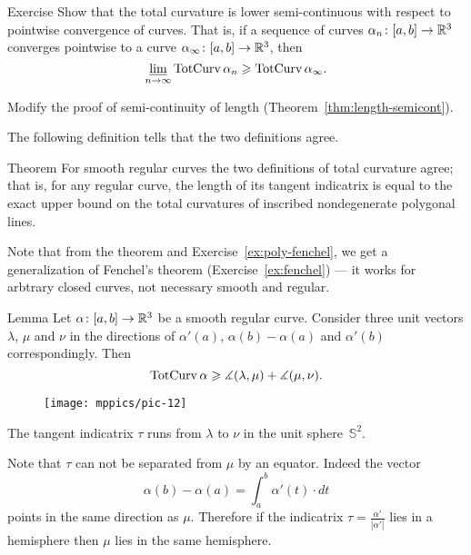 \begin{thm}{Exercise}
Show that the total curvature is lower semi-continuous with respect to pointwise convergence of curves.
That is, if a sequence
of curves $\alpha_n\colon[a,b]\to \mathbb{R}^3$ converges pointwise 
to a curve $\alpha_\infty\:[a,b]\z\to \RR^3$, then 
\[\varliminf_{n\to\infty} \mathop{\rm TotCurv}\nolimits\alpha_n \geqslant \mathop{\rm TotCurv}\nolimits\alpha_\infty.\]
\end{thm}

 Modify the proof of semi-continuity of length (Theorem~\ref{thm:length-semicont}).


The following definition tells that the two definitions agree.

\begin{thm}{Theorem}\label{thm:total-curvature=}
For smooth regular curves the two definitions of total curvature agree;
that is, for any regular curve, the length of its tangent indicatrix is equal to the exact upper bound on the total curvatures of inscribed nondegenerate polygonal lines.
\end{thm}

Note that from the theorem and Exercise~\ref{ex:poly-fenchel}, we get a generalization of Fenchel's theorem (Exercise~\ref{ex:fenchel}) --- it works for arbtrary closed curves, not necessary smooth and regular.

\begin{thm}{Lemma}\label{lem:uvw}
Let $\alpha\colon[a,b]\to\mathbb{R}^3$ be a smooth regular curve.
Consider three unit vectors $\lambda$, $\mu$ and $\nu$ in the directions of
$\alpha'(a)$, $\alpha(b)-\alpha(a)$ and $\alpha'(b)$ correspondingly.
Then 
\[\mathop{\rm TotCurv}\nolimits\alpha\geqslant\measuredangle (\lambda,\mu)+\measuredangle (\mu,\nu).\]
\end{thm}

\begin{wrapfigure}{r}{45 mm}
\vskip-7mm
\centering
\texttt{[image: mppics/pic-12]}
\vskip0mm
\end{wrapfigure}

The tangent indicatrix $\tau$ runs from $\lambda$ to $\nu$ in the unit sphere~$\mathbb{S}^2$.

Note that $\tau$ can not be separated from $\mu$ by an equator.
Indeed the vector 
\[\alpha(b)-\alpha(a)=\int_a^b\alpha'(t)\cdot dt\]
points in the same direction as $\mu$.
Therefore if the indicatrix $\tau=\tfrac{\alpha'}{|\alpha'|}$ lies in a hemisphere then $\mu$ lies in the same hemisphere. 

